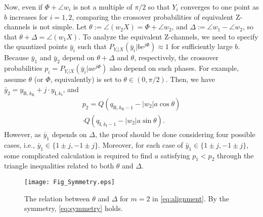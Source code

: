 \documentclass[journal]{IEEEtran}
\begin{document}
Now, even if $\Phi+ \angle w_i$ is not a multiple of $\pi/2$ so that $Y_i$ converges to one point as $b$ increases for $i=1,2$, comparing the crossover probabilities of equivalent Z-channels is not simple. 
Let $\theta := \angle (w_2 X) = \Phi + \angle w_2$, and ${\Delta := \angle w_1 - \angle w_2}$, so that $\theta + \Delta = \angle (w_1 X)$.
To analyze the equivalent Z-channels, we need to specify the quantized points $\bar{y}_i$ such that $P_{Y_i|X}(\bar{y}_i|be^{j\Phi}) \approx 1$ for sufficiently large $b$.
Because $\bar{y}_1$ and $\bar{y}_2$ depend on $\theta+\Delta$ and $\theta$, respectively, the crossover probabilities $p_i=P_{Y_i|X}(\bar{y}_i|ae^{j\Phi})$ also depend on such phases.
For example, assume $\theta$ (or $\Phi$, equivalently) is set to ${\theta \in (0,\pi/2)}$.
Then, we have ${\bar{y}_2 = y_{\mathrm{R},k_{\mathrm{R}}}+j\cdot y_{\mathrm{I},k_{\mathrm{I}}}}$, and
\begin{multline}
    p_2 = Q\left( q_{\mathrm{R},k_{\mathrm{R}}-1}-|w_2|a\cos\theta \right)
    \\ \cdot Q\left( q_{\mathrm{I},k_{\mathrm{I}}-1}-|w_2|a\sin\theta \right). \label{eqn:p2}
\end{multline}
However, as $\bar{y}_1$ depends on $\Delta$, the proof should be done considering four possible cases, i.e., $\bar{y}_1 \in \{1 \pm j, -1 \pm j\}$. Moreover, for each case of $\bar{y}_1 \in \{1 \pm j, -1 \pm j\}$, some complicated calculation is required to find $a$ satisfying $p_1<p_2$ through the triangle inequalities related to both $\theta$ and $\Delta$.

\begin{figure}[t]
    \centering
    \texttt{[image: Fig\_Symmetry.eps]}
    \caption{The relation between $\theta$ and $\Delta$ for $m=2$ in \eqref{eq:alignment}. By the symmetry, \eqref{eq:symmetry} holds.}
    \label{fig:Fig_Symmetry}
\end{figure}
\end{document}
